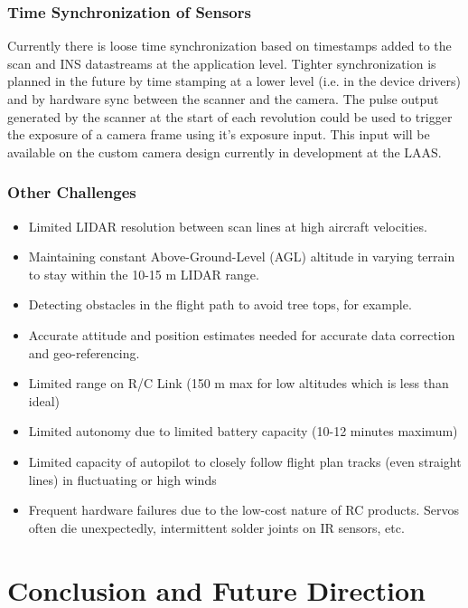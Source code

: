 \documentclass[a4paper,11pt]{report}
\begin{document}
\subsection{Time Synchronization of Sensors}
 
Currently there is loose time synchronization based on timestamps added to the scan and INS datastreams at the application level. Tighter synchronization is planned in the future by time stamping at a lower level (i.e. in the device drivers) and by hardware sync between the scanner and the camera. The pulse output generated by the scanner at the start of each revolution could be used to trigger the exposure of a camera frame using it's exposure input. This input will be available on the custom camera design currently in development at the LAAS.

\subsection{Other Challenges}

\begin{itemize}
 \item Limited LIDAR resolution between scan lines at high aircraft velocities.
 \item Maintaining constant Above-Ground-Level (AGL) altitude in varying terrain to stay within the 10-15 m LIDAR range.
 \item Detecting obstacles in the flight path to avoid tree tops, for example.
 \item Accurate attitude and position estimates needed for accurate data correction and geo-referencing.
 \item Limited range on R/C Link (150 m max for low altitudes which is less than ideal)
 \item Limited autonomy due to limited battery capacity (10-12 minutes maximum)
 \item Limited capacity of autopilot to closely follow flight plan tracks (even straight lines) in fluctuating or high winds
 \item Frequent hardware failures due to the low-cost nature of RC products. Servos often die unexpectedly, intermittent solder joints on IR sensors, etc.
\end{itemize}

\chapter{Conclusion and Future Direction}
\end{document}
